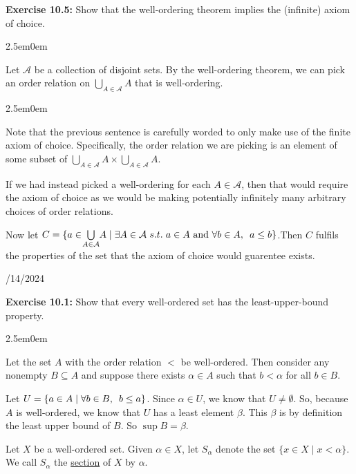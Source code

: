 \documentclass{book}
\newcommand{\hOne}{%
   \color{Black}%
   \fontsize{14}{16}\selectfont%
}
\newcommand{\myComment}{%
   \color{RawerSienna}%
   \fontsize{12}{14}\selectfont%
}
\newcommand{\exOne}{%
   \color{Purple}%
   \fontsize{14}{16}\selectfont%
}
\newcommand{\exTwo}{%
\color{Purple}%
   \fontsize{13}{15}\selectfont%
}
\newenvironment{myIndent}{%
   \begin{adjustwidth}{2.5em}{0em}%
}{%
   \end{adjustwidth}%
}
\newcommand{\udefine}[1]{{%
   \setulcolor{Red}%
   \setul{0.14em}{0.07em}%
   \ul{#1}%
}}
\newcommand{\blab}[1]{\textbf{#1}}
\newcommand{\suchthat}{ \hspace{0.3em}s.t.\hspace{0.3em}}
\newcommand{\myHS}{ \hspace{0.5em}}
\newcommand{\retTwo}{\hfill\bigbreak}
\newcommand{\dispDate}[1]{{
   \color{Black}%
   \fontsize{20}{18}\selectfont%
   #1\retTwo
}}
\begin{document}
   \exOne\blab{Exercise 10.5:} Show that the well-ordering theorem implies the (infinite) axiom of choice.
   \begin{myIndent}\exTwo
      Let $\mathcal{A}$ be a collection of disjoint sets. By the well-ordering theorem, we can pick an order relation on $\bigcup\limits_{A \in \mathcal{A}}A$ that is well-ordering.\newpage
      
      \begin{myIndent}\myComment
         Note that the previous sentence is carefully worded to only make use of the finite axiom of choice. Specifically, the order relation we are picking is an element of some subset of $\bigcup\limits_{A \in \mathcal{A}}A \times \bigcup\limits_{A \in \mathcal{A}}A$.\retTwo

         If we had instead picked a well-ordering for each $A \in \mathcal{A}$, then that would require the axiom of choice as we would be making potentially infinitely many arbitrary choices of order relations.\retTwo
      \end{myIndent}

      Now let $C = \{a \in \hspace{-0.2em}\bigcup\limits_{A \in \mathcal{A}}\hspace{-0.2em}A \mid \exists A \in \mathcal{A} \suchthat a \in A \text{ and } \forall b \in A,\myHS a \leq b \}$.\retTwo Then $C$ fulfils the properties of the set that the axiom of choice would guarentee exists.\retTwo
   \end{myIndent}

   \dispDate{9/14/2024}

   \blab{Exercise 10.1:} Show that every well-ordered set has the least-upper-bound\\ property.

   \begin{myIndent}\exTwo
      Let the set $A$ with the order relation $<$ be well-ordered. Then consider any nonempty $B \subseteq A$ and suppose there exists $\alpha \in A$ such that $b < \alpha$ for all $b \in B$.\retTwo

      Let $U = \{a \in A \mid \forall b \in B, \myHS b \leq a\}$. Since $\alpha \in U$, we know that $U \neq \emptyset$. So, because $A$ is well-ordered, we know that $U$ has a least element $\beta$. This $\beta$ is by definition the least upper bound of $B$. So $\sup{B} = \beta$.\retTwo\retTwo
   \end{myIndent}

   \hOne

   Let $X$ be a well-ordered set. Given $\alpha \in X$, let $S_\alpha$ denote the set $\{x \in X \mid x < \alpha\}$. We call $S_\alpha$ the \udefine{section} of $X$ by $\alpha$.\retTwo
\end{document}
